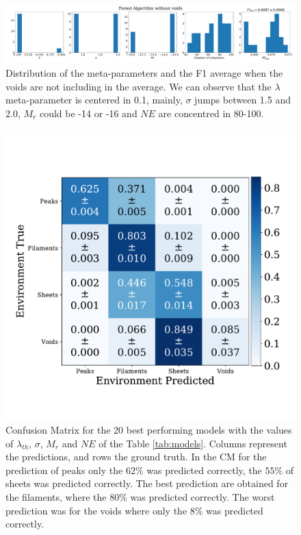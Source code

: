 \documentclass[usenatbib]{mnras}
\begin{document}
\begin{figure}
\centering
    \includegraphics[scale=0.22]{Figs/p_features_Forest_F1_av_no_voids.pdf}
    \caption{Distribution of the meta-parameters and the F1 average when the voids are not including in the average. We can observe that the $\lambda$ meta-parameter is centered in 0.1, mainly, $\sigma$ jumps between 1.5 and 2.0, $M_r$ could be -14 or -16 and $NE$ are concentred in 80-100.}
    \label{fig:feature_void}    
\end{figure}

\begin{figure}
\centering
    \includegraphics[scale=0.4]{Figs/p_confusion_matrix_21.pdf}
    \caption{Confusion Matrix for the 20 best performing models with the values of $\lambda_{th}$, $\sigma$, $M_{r}$ and $NE$ of the Table \ref{tab:models}. Columns represent the predictions, and rows the ground truth. In the CM for the prediction of peaks only the $62\%$ was predicted correctly, the $55\%$ of sheets was predicted correctly. The best prediction are obtained for the filaments, where the $80\%$ was predicted correctly. The worst prediction was for the voids where only the $8\%$ was predicted correctly.}
    \label{fig:confusion_matrix}    
\end{figure}
\end{document}
